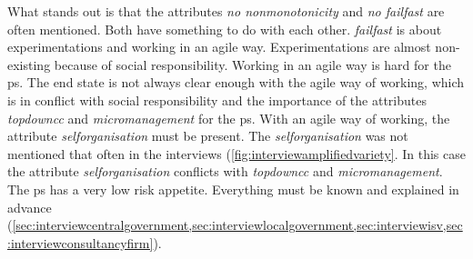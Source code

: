 What stands out is that the \glspl{attribute} \textit{no \gls{nonmonotonicity}} and \textit{no \gls{failfast}} are often mentioned. Both have something to do with each other. \textit{\Gls{failfast}} is about experimentations and working in an \gls{agile} way. Experimentations are almost non-existing because of social responsibility. Working in an \gls{agile} way is hard for the \gls{ps}. The end state is not always clear enough with the \gls{agile} way of working, which is in conflict with social responsibility and the importance of the attributes \textit{\gls{topdowncc}} and \textit{\gls{micromanagement}} for the \gls{ps}. With an \gls{agile} way of working, the attribute \textit{\gls{selforganisation}} must be present. The \textit{\gls{selforganisation}} was not mentioned that often in the interviews (\cref{fig:interviewamplifiedvariety}. In this case the \gls{attribute} \textit{\gls{selforganisation}} conflicts with \textit{\gls{topdowncc}} and \textit{\gls{micromanagement}}. The \gls{ps} has a very low risk appetite. Everything must be known and explained in advance (\cref{sec:interviewcentralgovernment,sec:interviewlocalgovernment,sec:interviewisv,sec:interviewconsultancyfirm}). 
